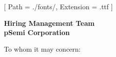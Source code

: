 


\renewcommand{\photo}[2]{}

\geometry{
  left=2cm,
  right=2cm,
  top=2cm,
  bottom=2cm
}



\makecvheader

\setmainfont{NotoSans-Regular}[
  Path = ./fonts/,
  Extension = .ttf
]

\vspace{1cm}
\indent\textbf{Hiring Management Team}\\
\indent\textbf{pSemi Corporation}

\vspace{0.5cm}

\noindent To whom it may concern:

\vspace{0.5cm}

